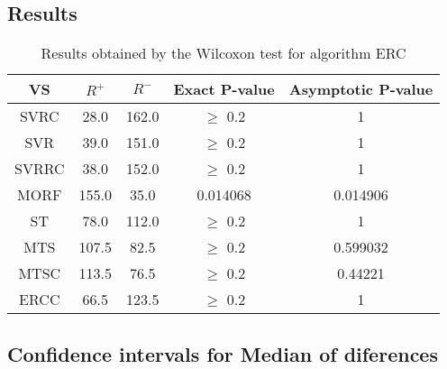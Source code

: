 \documentclass[a4paper,10pt]{article}
\begin{document}
\subsection{Results}

\begin{table}[!htp]
\centering\small
\begin{tabular}{
|c|c|c|c|c|}
\hline
 VS & $R^{+}$ & $R^{-}$ & Exact P-value & Asymptotic P-value \\ \hline 
SVRC & 28.0 & 162.0 & $\geq$ 0.2 & 1\\ \hline 
SVR & 39.0 & 151.0 & $\geq$ 0.2 & 1\\ \hline 
SVRRC & 38.0 & 152.0 & $\geq$ 0.2 & 1\\ \hline 
MORF & 155.0 & 35.0 & 0.014068 & 0.014906\\ \hline 
ST & 78.0 & 112.0 & $\geq$ 0.2 & 1\\ \hline 
MTS & 107.5 & 82.5 & $\geq$ 0.2 & 0.599032\\ \hline 
MTSC & 113.5 & 76.5 & $\geq$ 0.2 & 0.44221\\ \hline 
ERCC & 66.5 & 123.5 & $\geq$ 0.2 & 1\\ \hline 

\end{tabular}
\caption{Results obtained by the Wilcoxon test for algorithm ERC}
\end{table}

\subsection{Confidence intervals for Median of diferences}
\end{document}
